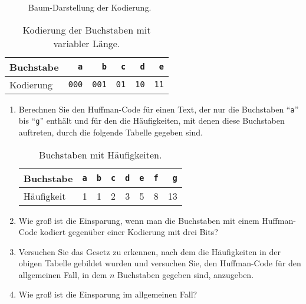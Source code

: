\begin{figure}[!ht]
  \centering
  \caption{Baum-Darstellung der Kodierung.}
  \label{fig:coding-tree2}
\end{figure}



\begin{table}[htbp]
  \centering
\begin{tabular}[t]{|l|r|r|r|r|r|}
\hline
Buchstabe &   \texttt{a} &   \texttt{b} & \texttt{c}  & \texttt{d}  & \texttt{e}   \\
\hline
Kodierung & \texttt{000} & \texttt{001} & \texttt{01} & \texttt{10} & \texttt{11} \\
\hline
\end{tabular}
  \caption{Kodierung der Buchstaben mit variabler L\"ange.}
  \label{tab:coding2}
\end{table}


\exercise
\begin{enumerate}
\item Berechnen Sie den Huffman-Code f\"ur einen Text, der nur die Buchstaben
      ``\texttt{a}'' bis ``\texttt{g}'' enth\"alt und f\"ur den die H\"aufigkeiten,
      mit denen diese Buchstaben auftreten, durch die folgende Tabelle gegeben sind.

\begin{table}[htbp]
  \centering
\begin{tabular}[t]{|l|r|r|r|r|r|r|r|}
\hline
Buchstabe  & \texttt{a} & \texttt{b} & \texttt{c} & \texttt{d} & \texttt{e} & \texttt{f} & \texttt{g} \\
\hline
H\"aufigkeit &          1 &          1 &          2 &          3 &          5 &         8 &         13 \\
\hline
\end{tabular}
  \caption{Buchstaben mit H\"aufigkeiten.}
  \label{tab:aufgabe-huffman}
\end{table}

\item Wie gro{\ss} ist die Einsparung, wenn man die Buchstaben mit einem Huffman-Code
      kodiert gegen\"uber einer Kodierung mit drei Bits?
\item Versuchen Sie das Gesetz zu erkennen, nach dem die H\"aufigkeiten in der obigen Tabelle 
      gebildet wurden und versuchen Sie, den Huffman-Code f\"ur den allgemeinen Fall,
      in dem $n$ Buchstaben gegeben sind, anzugeben.
\item Wie gro{\ss} ist die Einsparung im allgemeinen Fall?
\end{enumerate}


